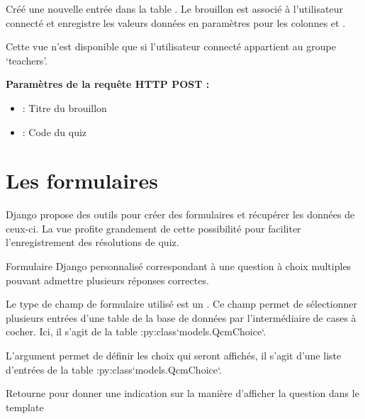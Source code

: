 \documentclass[a4,10pt,french]{sphinxmanual}
\begin{document}

\begin{fulllineitems}
\label{source:quiz.views.savedraft}
Créé une nouvelle entrée dans la table . Le brouillon est associé
à l'utilisateur connecté et enregistre les valeurs données en paramètres pour
les colonnes  et .

Cette vue n'est disponible que si l'utilisateur connecté appartient au groupe
`teachers'.

\textbf{Paramètres de la requête HTTP POST :}
\begin{itemize}
\item {} 
 : Titre du brouillon

\item {} 
 : Code du quiz

\end{itemize}

\end{fulllineitems}



\section{Les formulaires}
\label{source:les-formulaires}
Django propose des outils pour créer des formulaires et récupérer les
données de ceux-ci. La vue  profite grandement de cette possibilité
pour faciliter l'enregistrement des résolutions de quiz.
\label{source:module-quiz.forms}

\begin{fulllineitems}
\label{source:quiz.forms.CheckboxForm}
Formulaire Django personnalisé correspondant à une question à choix multiples
pouvant admettre plusieurs réponses correctes.

Le type de champ de formulaire utilisé est un . Ce champ permet
de sélectionner plusieurs entrées d'une table de la base de données par l'intermédiaire
de cases à cocher. Ici, il s'agit
de la table :py:class{}`models.QcmChoice{}`.

L'argument  permet de définir les choix qui seront affichés, il s'agit
d'une liste d'entrées de la table :py:class{}`models.QcmChoice{}`.

\begin{fulllineitems}
\label{source:quiz.forms.CheckboxForm.get_type}
Retourne  pour donner une indication sur la manière d'afficher 
la question dans le template

\end{fulllineitems}


\end{fulllineitems}
\end{document}
